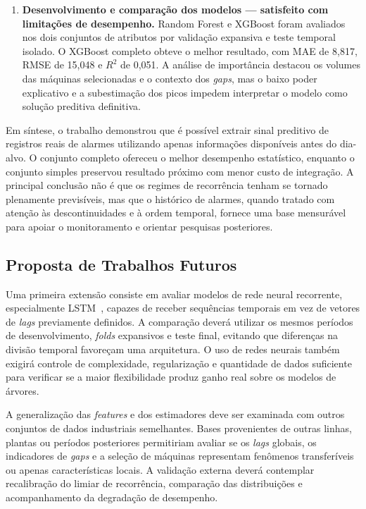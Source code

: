 \begin{enumerate}
    \item \textbf{Desenvolvimento e comparação dos modelos --- satisfeito com limitações de desempenho.} Random Forest e XGBoost foram avaliados nos dois conjuntos de atributos por validação expansiva e teste temporal isolado. O XGBoost completo obteve o melhor resultado, com MAE de 8,817, RMSE de 15,048 e $R^2$ de 0,051. A análise de importância destacou os volumes das máquinas selecionadas e o contexto dos \textit{gaps}, mas o baixo poder explicativo e a subestimação dos picos impedem interpretar o modelo como solução preditiva definitiva.
\end{enumerate}

Em síntese, o trabalho demonstrou que é possível extrair sinal preditivo de registros reais de alarmes utilizando apenas informações disponíveis antes do dia-alvo. O conjunto completo ofereceu o melhor desempenho estatístico, enquanto o conjunto simples preservou resultado próximo com menor custo de integração. A principal conclusão não é que os regimes de recorrência tenham se tornado plenamente previsíveis, mas que o histórico de alarmes, quando tratado com atenção às descontinuidades e à ordem temporal, fornece uma base mensurável para apoiar o monitoramento e orientar pesquisas posteriores.

\subsection{Proposta de Trabalhos Futuros}

Uma primeira extensão consiste em avaliar modelos de rede neural recorrente, especialmente LSTM~\cite{hochreiter1997lstm}, capazes de receber sequências temporais em vez de vetores de \textit{lags} previamente definidos. A comparação deverá utilizar os mesmos períodos de desenvolvimento, \textit{folds} expansivos e teste final, evitando que diferenças na divisão temporal favoreçam uma arquitetura. O uso de redes neurais também exigirá controle de complexidade, regularização e quantidade de dados suficiente para verificar se a maior flexibilidade produz ganho real sobre os modelos de árvores.

A generalização das \textit{features} e dos estimadores deve ser examinada com outros conjuntos de dados industriais semelhantes. Bases provenientes de outras linhas, plantas ou períodos posteriores permitiriam avaliar se os \textit{lags} globais, os indicadores de \textit{gaps} e a seleção de máquinas representam fenômenos transferíveis ou apenas características locais. A validação externa deverá contemplar recalibração do limiar de recorrência, comparação das distribuições e acompanhamento da degradação de desempenho.

